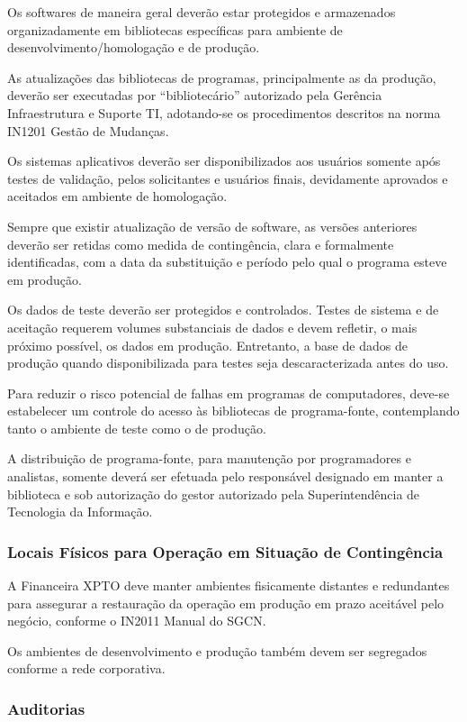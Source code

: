 \documentclass[a4paper,12pt]{article}
\begin{document}
Os softwares de maneira geral deverão estar protegidos e armazenados organizadamente em bibliotecas específicas para ambiente de desenvolvimento/homologação e de produção.

As atualizações das bibliotecas de programas, principalmente as da produção, deverão ser executadas por ``bibliotecário'' autorizado pela Gerência Infraestrutura e Suporte TI, adotando-se os procedimentos descritos na norma IN1201 Gestão de Mudanças.

Os sistemas aplicativos deverão ser disponibilizados aos usuários somente após testes de validação, pelos solicitantes e usuários finais, devidamente aprovados e aceitados em ambiente de homologação. 

Sempre que existir atualização de versão de software, as versões anteriores deverão ser retidas como medida de contingência, clara e formalmente identificadas, com a data da substituição e período pelo qual o programa esteve em produção.

Os dados de teste deverão ser protegidos e controlados. Testes de sistema e de aceitação requerem volumes substanciais de dados e devem refletir, o mais próximo possível, os dados em produção. Entretanto, a base de dados de produção quando disponibilizada para testes seja descaracterizada antes do uso.

Para reduzir o risco potencial de falhas em programas de computadores, deve-se estabelecer um controle do acesso às bibliotecas de programa-fonte, contemplando tanto o ambiente de teste como o de produção.

A distribuição de programa-fonte, para manutenção por programadores e analistas, somente deverá ser efetuada pelo responsável designado em manter a biblioteca e sob autorização do gestor autorizado pela Superintendência de Tecnologia da Informação.

\subsubsection{Locais Físicos para Operação em Situação de Contingência}

A Financeira XPTO deve manter ambientes fisicamente distantes e redundantes para assegurar a restauração da operação em produção em prazo aceitável pelo negócio, conforme o IN2011 Manual do SGCN.

Os ambientes de desenvolvimento e produção também devem ser segregados conforme a rede corporativa.

\subsubsection{Auditorias}
\end{document}
